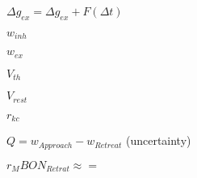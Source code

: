$\Delta g_{ex} = \Delta g_{ex} + F(\Delta t)$

$w_{inh}$

$w_{ex}$

$V_{th}$

$V_{rest}$

$r_{kc}$

$Q = w_{Approach} - w_{Retreat}$ (uncertainty)


$r_MBON_{Retrat} \approx =  $